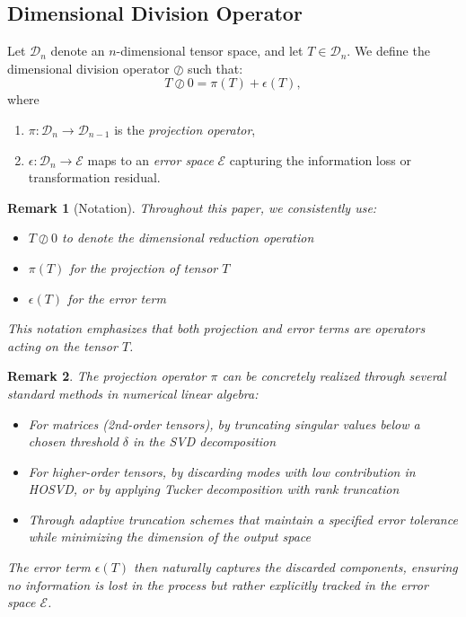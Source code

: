 \documentclass[sn-mathphys-num]{sn-jnl}
\theoremstyle{thmstyleone}
\theoremstyle{thmstyletwo}
\newtheorem{remark}{Remark}
\theoremstyle{thmstylethree}
\begin{document}
\subsection{Dimensional Division Operator}

Let $\mathcal{D}_n$ denote an $n$-dimensional tensor space, and let $T \in \mathcal{D}_n$. 
We define the dimensional division operator $\oslash$ such that:
\[
T \oslash 0 = \pi(T) + \epsilon(T),
\]
where 
\begin{enumerate}
\item $\pi: \mathcal{D}_n \to \mathcal{D}_{n-1}$ is the \emph{projection operator},  
\item $\epsilon: \mathcal{D}_n \to \mathcal{E}$ maps to an \emph{error space} $\mathcal{E}$ 
capturing the information loss or transformation residual.
\end{enumerate}

\begin{remark}[Notation]
Throughout this paper, we consistently use:
\begin{itemize}
    \item $T \oslash 0$ to denote the dimensional reduction operation
    \item $\pi(T)$ for the projection of tensor $T$
    \item $\epsilon(T)$ for the error term
\end{itemize}
This notation emphasizes that both projection and error terms are operators acting on the tensor $T$.
\end{remark}

\begin{remark}
The projection operator $\pi$ can be concretely realized through several standard methods in numerical linear algebra:
\begin{itemize}
    \item For matrices (2nd-order tensors), by truncating singular values below a chosen threshold $\delta$ in the SVD decomposition
    \item For higher-order tensors, by discarding modes with low contribution in HOSVD, or by applying Tucker decomposition with rank truncation
    \item Through adaptive truncation schemes that maintain a specified error tolerance while minimizing the dimension of the output space
\end{itemize}
The error term $\epsilon(T)$ then naturally captures the discarded components, ensuring no information is lost in the process but rather explicitly tracked in the error space $\mathcal{E}$.
\end{remark}
\end{document}
